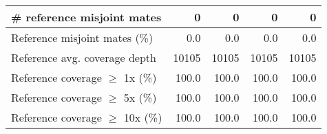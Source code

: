 \documentclass[12pt,a4paper]{article}
\begin{document}
\begin{table}[ht]
\begin{center}
\begin{tabular}{|l*{4}{|r}|}
\# reference misjoint mates & 0 & 0 & 0 & 0 \\ \hline
Reference misjoint mates (\%) & 0.0 & 0.0 & 0.0 & 0.0 \\ \hline
Reference avg. coverage depth & 10105 & 10105 & 10105 & 10105 \\ \hline
Reference coverage $\geq$ 1x (\%) & 100.0 & 100.0 & 100.0 & 100.0 \\ \hline
Reference coverage $\geq$ 5x (\%) & 100.0 & 100.0 & 100.0 & 100.0 \\ \hline
Reference coverage $\geq$ 10x (\%) & 100.0 & 100.0 & 100.0 & 100.0 \\ \hline
\end{tabular}
\end{center}
\end{table}
\end{document}
